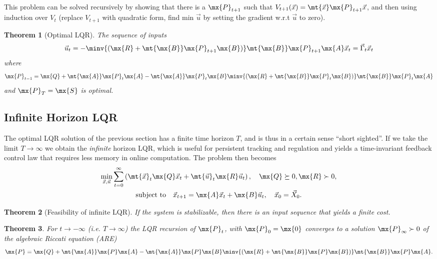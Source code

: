 \documentclass[margin=small]{hsrzf}
\newtheorem{thm}{Theorem}
\begin{document}
This problem can be solved recursively by showing that there is a
$\mx{P}_{t+1}$ such that $V_{t+1}(\vec{x}) = \mt{\vec{x}} \mx{P}_{t+1} \vec{x}$, and
then using induction over $V_t$ (replace $V_{t+1}$ with quadratic form, find
min $\vec{u}$ by setting the gradient w.r.t $\vec{u}$ to zero).

\begin{thm}[Optimal LQR]
  The sequence of inputs
  \[
    \vec{u}_t = -\minv{(\mx{R} + \mt{\mx{B}} \mx{P}_{t+1} \mx{B})}
      \mt{\mx{B}} \mx{P}_{t+1} \mx{A} \vec{x}_t = \vec{\Gamma}_{t} \vec{x}_t
  \]
  where
  \[
    \mx{P}_{t-1} = \mx{Q} + \mt{\mx{A}} \mx{P}_t \mx{A}
      - \mt{\mx{A}} \mx{P}_t \mx{B} \minv{
        (\mx{R} + \mt{\mx{B}} \mx{P}_t \mx{B})
      } \mt{\mx{B}} \mx{P}_t \mx{A}
  \]
  and $\mx{P}_T = \mx{S}$ is optimal.
\end{thm}

\subsection{Infinite Horizon LQR}

The optimal LQR solution of the previous section has a finite time horizon
$T$, and is thus in a certain sense ``short sighted''. If we take the limit
$T \to \infty$ we obtain the \emph{infinite} horizon LQR, which is useful for
persistent tracking and regulation and yields a time-invariant feedback
control law that requires less memory in online computation. The problem then
becomes
\begin{gather*}
  \min_{\vec{x}, \vec{u}} \sum_{t=0}^\infty \left(
    \mt{\vec{x}}_t \mx{Q} \vec{x}_t + \mt{\vec{u}}_t \mx{R} \vec{u}_t
  \right),\quad \mx{Q} \succeq 0, \mx{R} \succ 0, \\
  \text{subject to}\quad \vec{x}_{t+1} = \mx{A} \vec{x}_t + \mx{B} \vec{u}_t,
    \quad \vec{x}_0 = \vec{X}_0.
\end{gather*}

\begin{thm}[Feasibility of infinite LQR]
  If the system is stabilizable, then there is an input sequence that yields a
  finite cost.
\end{thm}

\begin{thm}
  For $t\to -\infty$ (i.e. $T\to\infty$) the LQR recursion of $\mx{P}_t$, with
  $\mx{P}_0 = \mx{0}$ converges to a solution $\mx{P}_\infty \succ 0$ of the
  algebraic Riccati equation (ARE) 
  \[
    \mx{P} = \mx{Q} + \mt{\mx{A}} \mx{P} \mx{A}
      - \mt{\mx{A}} \mx{P} \mx{B} \minv{
        (\mx{R} + \mt{\mx{B}} \mx{P} \mx{B})
      } \mt{\mx{B}} \mx{P} \mx{A}.
  \]
\end{thm}
\end{document}
